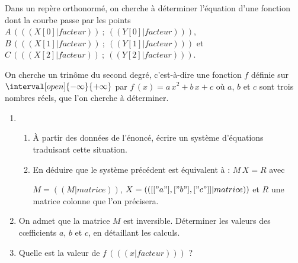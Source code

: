 \exercice
Dans un repère orthonormé, on cherche à déterminer l'équation d'une fonction dont la courbe passe par les points
$A\,( (( X[0]|facteur )) ~;~ (( Y[0]|facteur )) )$,
$B\,( (( X[1]|facteur )) ~;~ (( Y[1]|facteur )) )$ et
$C\,( (( X[2]|facteur )) ~;~ (( Y[2]|facteur )) )$.

On cherche un trinôme du second degré, c'est-à-dire une fonction $f$ définie sur $\interval[open]{-\infty}{+\infty}$ par
 \mbox{$f\,(x) = a\,x^2 + b\,x + c$} où $a$, $b$ et $c$ sont trois nombres réels, que l'on cherche à déterminer.

  \begin{enumerate}
    \item 
      \begin{enumerate}
        \item À partir des données de l'énoncé, écrire un système d'équations traduisant cette situation.
        \item En déduire que le système précédent est équivalent à : $M\,X = R$ avec

          $M = (( M|matrice ))$, $X= (( [["a"], ["b"], ["c"]]|matrice ))$ et $R$ une matrice colonne que l'on précisera.
      \end{enumerate}
  \end{enumerate}
  \begin{enumerate}
      \setcounter{enumi}{1}
    \item On admet que la matrice $M$ est inversible.
      Déterminer les valeurs des cœfficients $a$, $b$ et $c$, en détaillant les calculs.
    \item Quelle est la valeur de $f\,( (( x|facteur )) )$ ?

  \end{enumerate}
